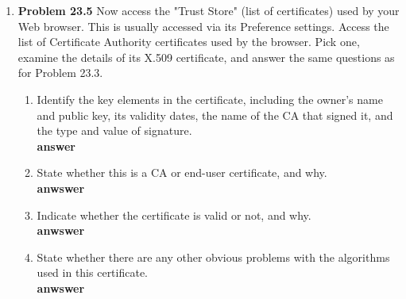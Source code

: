 \documentclass[12pt]{article}
\begin{document}
\begin{enumerate}
\begin{enumerate}
  \end{enumerate}

  \item \textbf{Problem 23.5} Now access the "Trust Store" (list of certificates) used by your Web browser. This is usually accessed via its Preference settings. Access the list of Certificate Authority certificates used by the browser. Pick one, examine the details of its X.509 certificate, and answer the same questions as for Problem 23.3. \\

  \begin{enumerate}
    \item Identify the key elements in the certificate, including the owner's name and public key, its validity dates, the name of the CA that signed it, and the type and value of signature. \\

    \textbf{answer} \\

    \item State whether this is a CA or end-user certificate, and why. \\

    \textbf{anwswer} \\

    \item Indicate whether the certificate is valid or not, and why. \\

    \textbf{anwswer} \\

    \item State whether there are any other obvious problems with the algorithms used in this certificate. \\

    \textbf{anwswer} \\

  \end{enumerate}
\end{enumerate}
\end{document}
